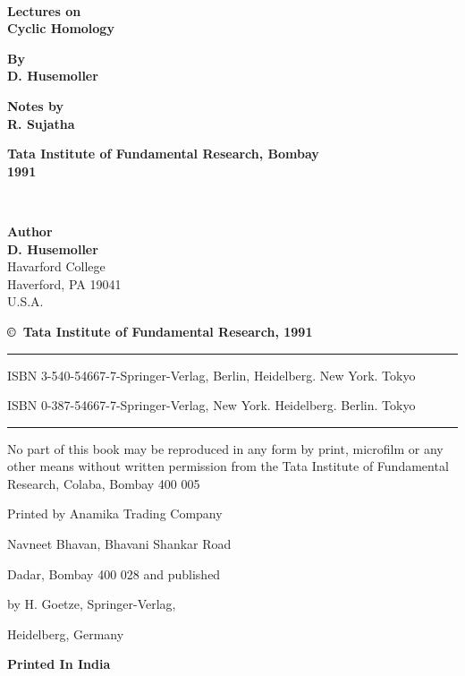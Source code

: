 ~\phantom{a}
\thispagestyle{empty}

\begin{center}
{\Large\bf Lectures on}\\[5pt]
{\Large\bf Cyclic Homology}
\vfill


{\bf By}\\[5pt]
{\large\bf D. Husemoller}
\vfill

{\bf Notes by}\\[5pt]
{\large\bf R. Sujatha}
\vfill

{\bf Tata Institute of Fundamental Research, Bombay}\\
{\bf 1991}
\end{center}

\eject

~\phantom{a}
\thispagestyle{empty}
\begin{center}
{\bf Author}\\[4pt]
{\large\bf D. Husemoller}\\
{Havarford College}\\
{Haverford, PA 19041}\\
{U.S.A.}
\vfill

{\bf\copyright\ Tata Institute of Fundamental Research, 1991}
\vskip 1cm

\noindent
\rule{\textwidth}{1pt}

\noindent
{\small ISBN 3-540-54667-7-Springer-Verlag, Berlin, Heidelberg. New
York. Tokyo}
\noindent

{\small ISBN 0-387-54667-7-Springer-Verlag, New
York. Heidelberg. Berlin. Tokyo}

\noindent
\rule{\textwidth}{1pt}
\vfill

\parbox{0.7\textwidth}{No part of this book may be reproduced in any
  form by print, microfilm or any other means without written
  permission from the Tata Institute of Fundamental Research, Colaba,
  Bombay 400 005}
\vfill

Printed by Anamika Trading Company

Navneet Bhavan, Bhavani Shankar Road

Dadar, Bombay 400 028 and published

by H. Goetze, Springer-Verlag,

Heidelberg, Germany
\bigskip

{\bf Printed In India}
\end{center}

\eject


